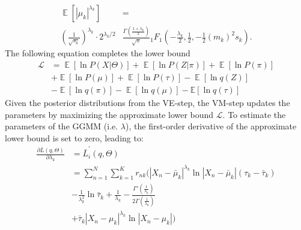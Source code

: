 \documentclass[conference]{IEEEtran}
\begin{document}
    \begin{equation}
        \begin{split}
            \displaystyle \operatorname {\mathbb{E}} \left[|\mu_k|^{\lambda_k}\right]&=\\
            (\frac{1}{\sqrt{s_k}})^{\lambda_k}\cdot 2^{\lambda_k/2}&{\frac {\Gamma \left({\frac {1+\lambda_k}{2}}\right)}{\sqrt {\pi }}}
            {}_{1}F_{1}\left(-{\frac {\lambda_k}{2}},{\frac {1}{2}},-{\frac {1}{2}}\left({m_k}\right)^{2} s_k \right).  
        \end{split}
    \end{equation}
    The following equation completes the lower bound
    \begin{equation}
        \begin{split}\label{lowerbound}
         \mathcal{L}&= \mathop{\mathbb{E}}[\ln P(X|\Theta)] + \mathop{\mathbb{E}}[\ln P(Z|\pi)] +\mathop{\mathbb{E}}[\ln P(\pi)]\\
        &+ \mathop{\mathbb{E}}[\ln P(\mu)]+\mathop{\mathbb{E}}[\ln P(\tau)] -\mathop{\mathbb{E}}[\ln q(Z)]\\
        &-\mathop{\mathbb{E}}[\ln q(\pi)]-\mathop{\mathbb{E}}[\ln q(\mu)]-\mathbb{E}[\ln q(\tau)]
        \end{split}
        \end{equation}
        Given the posterior distributions from the VE-step, the VM-step updates the parameters by maximizing the approximate lower bound $\mathcal{L}$.
        To estimate the parameters of the GGMM (i.e. $\lambda$), the first-order derivative of the approximate lower bound is set to zero, leading to:
        \begin{equation}
            \begin{split}
                \frac{\partial \bar{L}(q, \Theta)}{\partial \lambda_k} &= \bar{L}_i^{'}(q, \Theta)\\
                &=\sum_{n=1}^{N}\sum_{k=1}^{K} r_{nk}(|X_n - \bar{\mu}_k|^{\lambda_k} \ln |X_n - \bar{\mu}_k|(\tau_k - \bar{\tau}_k) \\
                &- \frac{1}{\lambda_k^2} \ln \bar{\tau}_k + \frac{1}{\lambda_k} - \frac{\Gamma'(\frac{1}{\lambda_k})}{2\Gamma(\frac{1}{\lambda_k})} \\
                &+ \bar{\tau}_k|X_n - \mu_k|^{\lambda_k} \ln |X_n - \mu_k|)
            \end{split}
        \end{equation}
\end{document}
